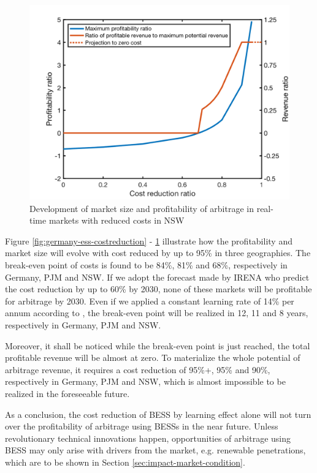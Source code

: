 \begin{figure}[h!]
	\centering
	\includegraphics[width=0.9\linewidth]{Figures/CostReduction_NSW_ESS}
	\caption{Development of market size and profitability of arbitrage in real-time markets with reduced costs in NSW}
	\label{fig:nsw-ess-costreduction}
\end{figure}

Figure \ref{fig:germany-ess-costreduction} - \ref{fig:nsw-ess-costreduction} illustrate how the profitability and market size will evolve with cost reduced by up to 95\% in three geographies. The break-even point of costs is found to be 84\%, 81\% and 68\%, respectively in Germany, PJM and NSW. If we adopt the forecast made by IRENA\cite{IRENA2017} who predict the cost reduction by up to 60\% by 2030, none of these markets will be profitable for arbitrage by 2030. Even if we applied a constant learning rate of 14\% per annum according to \cite{Nykvist2015}, the break-even point will be realized in 12, 11 and 8 years, respectively in Germany, PJM and NSW. 

Moreover, it shall be noticed while the break-even point is just reached, the total profitable revenue will be almost at zero. To materialize the whole potential of arbitrage revenue, it requires a cost reduction of 95\%+, 95\% and 90\%, respectively in Germany, PJM and NSW, which is almost impossible to be realized in the foreseeable future.

As a conclusion, the cost reduction of BESS by learning effect alone will not turn over the profitability of arbitrage using BESSs in the near future. Unless revolutionary technical innovations happen, opportunities of arbitrage using BESS may only arise with drivers from the market, e.g. renewable penetrations, which are to be shown in Section \ref{sec:impact-market-condition}.

